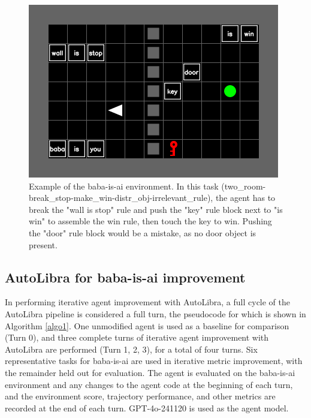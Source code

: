 \begin{figure}[ht]
    \centering
    \includegraphics[scale=0.5]{figs/babaisai_env.png}
    \caption{Example of the baba-is-ai environment. In this task (two\_room-break\_stop-make\_win-distr\_obj-irrelevant\_rule), the agent has to break the "wall is stop" rule and push the "key" rule block next to "is win" to assemble the win rule, then touch the key to win. Pushing the "door" rule block would be a mistake, as no door object is present.}
    \label{fig:babaisai_env}
\end{figure}

\subsection{AutoLibra for baba-is-ai improvement}

In performing iterative agent improvement with AutoLibra, a full cycle of the AutoLibra pipeline is considered a full turn, the pseudocode for which is shown in Algorithm \ref{algo1}. One unmodified agent is used as a baseline for comparison (Turn 0), and three complete turns of iterative agent improvement with AutoLibra are performed (Turn 1, 2, 3), for a total of four turns. Six representative tasks for baba-is-ai are used in iterative metric improvement, with the remainder held out for evaluation. The agent is evaluated on the baba-is-ai environment and any changes to the agent code at the beginning of each turn, and the environment score, trajectory performance, and other metrics are recorded at the end of each turn. GPT-4o-241120 is used as the agent model.


